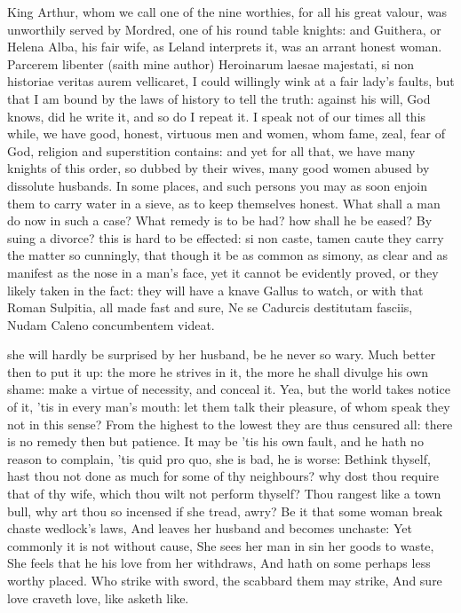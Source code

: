 {King Arthur, whom we call one of the nine worthies, for all his
great valour, was unworthily served by Mordred, one of his round table
knights: and Guithera, or Helena Alba, his fair wife, as Leland
interprets it, was an arrant honest woman. Parcerem libenter (saith
mine author) Heroinarum laesae majestati, si non historiae
veritas aurem vellicaret, I could willingly wink at a fair lady's
faults, but that I am bound by the laws of history to tell the truth:
against his will, God knows, did he write it, and so do I repeat it. I
speak not of our times all this while, we have good, honest, virtuous
men and women, whom fame, zeal, fear of God, religion and superstition
contains: and yet for all that, we have many knights of this order, so
dubbed by their wives, many good women abused by dissolute husbands. In
some places, and such persons you may as soon enjoin them to carry
water in a sieve, as to keep themselves honest. What shall a man do now
in such a case? What remedy is to be had? how shall he be eased? By
suing a divorce? this is hard to be effected: si non caste, tamen caute
they carry the matter so cunningly, that though it be as common as
simony, as clear and as manifest as the nose in a man's face, yet it
cannot be evidently proved, or they likely taken in the fact: they will
have a knave Gallus to watch, or with that Roman Sulpitia, all
made fast and sure,
Ne se Cadurcis destitutam fasciis,
Nudam Caleno concumbentem videat.

she will hardly be surprised by her husband, be he never so wary. Much
better then to put it up: the more he strives in it, the more he shall
divulge his own shame: make a virtue of necessity, and conceal it. Yea,
but the world takes notice of it, 'tis in every man's mouth: let them
talk their pleasure, of whom speak they not in this sense? From the
highest to the lowest they are thus censured all: there is no remedy
then but patience. It may be 'tis his own fault, and he hath no reason
to complain, 'tis quid pro quo, she is bad, he is worse: Bethink
thyself, hast thou not done as much for some of thy neighbours? why
dost thou require that of thy wife, which thou wilt not perform
thyself? Thou rangest like a town bull, why art thou so incensed
if she tread, awry?
Be it that some woman break chaste wedlock's laws,
And leaves her husband and becomes unchaste:
Yet commonly it is not without cause,
She sees her man in sin her goods to waste,
She feels that he his love from her withdraws,
And hath on some perhaps less worthy placed.
Who strike with sword, the scabbard them may strike,
And sure love craveth love, like asketh like.

}
